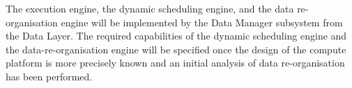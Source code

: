 \documentclass[11pt,a4paper]{article}
\begin{document}
The execution engine, the dynamic scheduling engine, and the data
re-organisation engine will be implemented by the Data Manager
subsystem from the Data Layer. The required capabilities of the
dynamic scheduling engine and the data-re-organisation engine will be
specified once the design of the compute platform is more precisely
known and an initial analysis of data re-organisation has been
performed.

\clearpage
{}
%
\end{document}
